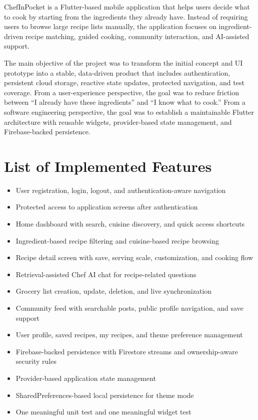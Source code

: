 \documentclass[11pt,a4paper]{article}
\begin{document}
ChefInPocket is a Flutter-based mobile application that helps users decide what to cook by starting from the ingredients they already have. Instead of requiring users to browse large recipe lists manually, the application focuses on ingredient-driven recipe matching, guided cooking, community interaction, and AI-assisted support.

The main objective of the project was to transform the initial concept and UI prototype into a stable, data-driven product that includes authentication, persistent cloud storage, reactive state updates, protected navigation, and test coverage. From a user-experience perspective, the goal was to reduce friction between ``I already have these ingredients'' and ``I know what to cook.'' From a software engineering perspective, the goal was to establish a maintainable Flutter architecture with reusable widgets, provider-based state management, and Firebase-backed persistence.

\section{List of Implemented Features}

\begin{itemize}
  \item User registration, login, logout, and authentication-aware navigation
  \item Protected access to application screens after authentication
  \item Home dashboard with search, cuisine discovery, and quick access shortcuts
  \item Ingredient-based recipe filtering and cuisine-based recipe browsing
  \item Recipe detail screen with save, serving scale, customization, and cooking flow
  \item Retrieval-assisted Chef AI chat for recipe-related questions
  \item Grocery list creation, update, deletion, and live synchronization
  \item Community feed with searchable posts, public profile navigation, and save support
  \item User profile, saved recipes, my recipes, and theme preference management
  \item Firebase-backed persistence with Firestore streams and ownership-aware security rules
  \item Provider-based application state management
  \item SharedPreferences-based local persistence for theme mode
  \item One meaningful unit test and one meaningful widget test
\end{itemize}
\end{document}
